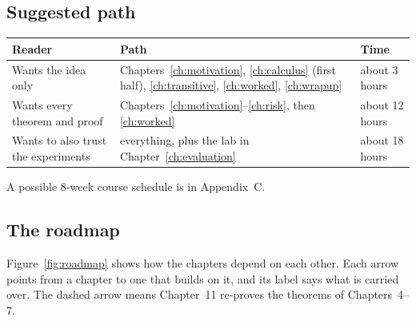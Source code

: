 
\subsection*{Suggested path}

\begin{center}
\renewcommand{\arraystretch}{1.25}
\begin{tabularx}{\textwidth}{@{}lXp{3.2cm}@{}}
\toprule
\textbf{Reader} & \textbf{Path} & \textbf{Time}\\
\midrule
Wants the idea only & Chapters~\ref{ch:motivation}, \ref{ch:calculus} (first half), \ref{ch:transitive}, \ref{ch:worked}, \ref{ch:wrapup} & about 3 hours\\
Wants every theorem and proof & Chapters~\ref{ch:motivation}--\ref{ch:risk}, then \ref{ch:worked} & about 12 hours\\
Wants to also trust the experiments & everything, plus the lab in Chapter~\ref{ch:evaluation} & about 18 hours\\
\bottomrule
\end{tabularx}
\end{center}

A possible 8-week course schedule is in Appendix~C.

\subsection*{The roadmap}

Figure~\ref{fig:roadmap} shows how the chapters depend on each other. Each arrow points from a chapter to one that builds on it, and its label says what is carried over. The dashed arrow means Chapter~11 re-proves the theorems of Chapters~4--7.

